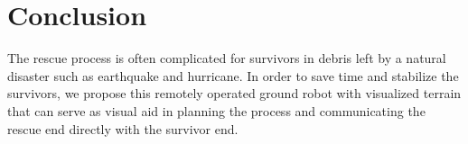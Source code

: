 \documentclass[a4paper,12pt]{article}
\begin{document}
\section{Conclusion}
The rescue process is often complicated for survivors in debris left by a natural disaster such as earthquake and hurricane. In order to save time and stabilize the survivors, we propose this remotely operated ground robot with visualized terrain that can serve as visual aid in planning the process and communicating the rescue end directly with the survivor end.



\medskip



\end{document}
